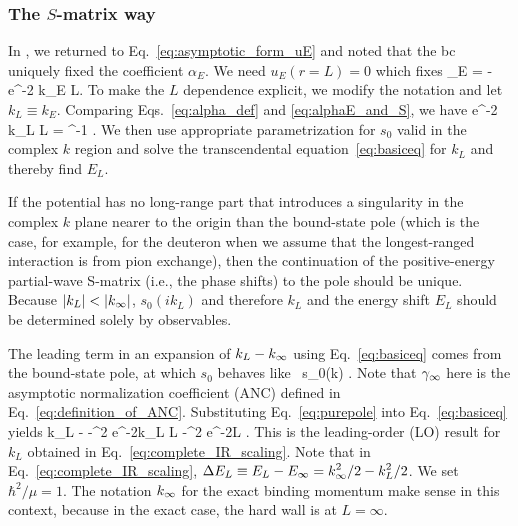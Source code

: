 	\subsubsection{The $S$-matrix way}

	In \cite{Furnstahl:2013vda}, we returned to Eq.~\eqref{eq:asymptotic_form_uE}
	and noted that the bc uniquely fixed the coefficient
	$\alpha_E$.  We need $u_E(r = L) = 0$ which fixes
	\beq
	\alpha_E = -e^{-2 k_E L}\;.
	\label{eq:alpha_def}
	\eeq
	To make the $L$ dependence explicit, we modify the notation and let
	$k_L \equiv k_E$.  Comparing Eqs.~\eqref{eq:alpha_def} and
	\eqref{eq:alphaE_and_S}, we have
	\beq
	e^{-2 k_L L} = \left[s_0(i k_L)\right]^{-1} \;.
	\label{eq:basiceq}
	\eeq
	We then use appropriate parametrization for $s_0$ valid in the complex $k$
	region and solve the transcendental
	equation~\eqref{eq:basiceq} for $k_L$ and thereby find $E_L$.

	If the potential has no long-range part that introduces a singularity
	in the complex $k$ plane nearer to the origin than the bound-state
	pole (which is the case, for example, for the deuteron when we assume that
	the longest-ranged interaction is from pion exchange), then the
	continuation of the positive-energy partial-wave S-matrix (i.e., the
	phase shifts) to the pole should be unique.  Because $|k_L| <
	|k_{\infty}|$, $s_0(i k_L)$ and therefore $k_L$ and the energy shift $E_L$
	should be determined solely by observables.

	The leading term in an expansion of $k_L - k_{\infty}$ using
	Eq.~\eqref{eq:basiceq} comes from the bound-state pole, at which $s_0$
	behaves like~\cite{newton2002scattering}
	\beq
	  s_0(k) \approx {}
	  \;.
	  \label{eq:purepole}
	\eeq
	Note that $\gamma_\infty$ here is
	the asymptotic normalization coefficient (ANC) defined in
	Eq.~\eqref{eq:definition_of_ANC}.
	Substituting Eq.~\eqref{eq:purepole} into Eq.~\eqref{eq:basiceq} yields
	\beq
	  k_L - \kinf \approx -\ANC^2 e^{-2k_L L} \approx -\ANC^2 e^{-2\kinf L}
	  \;.
	  \label{eq:kLatLO}
	\eeq
	This is the leading-order (LO) result for $k_L$ obtained in
	Eq.~\eqref{eq:complete_IR_scaling}.  Note that in
	Eq.~\eqref{eq:complete_IR_scaling}, $\displaystyle \Delta E_L \equiv
	E_L - E_{\infty} = k_{\infty}^2/2 - k_L^2/2$.  We set $\displaystyle \hbar^2/ \mu = 1$.
	The notation $k_{\infty}$ for the exact binding momentum make sense in this
	context, because in the exact case, the hard wall is at $L = \infty$.


